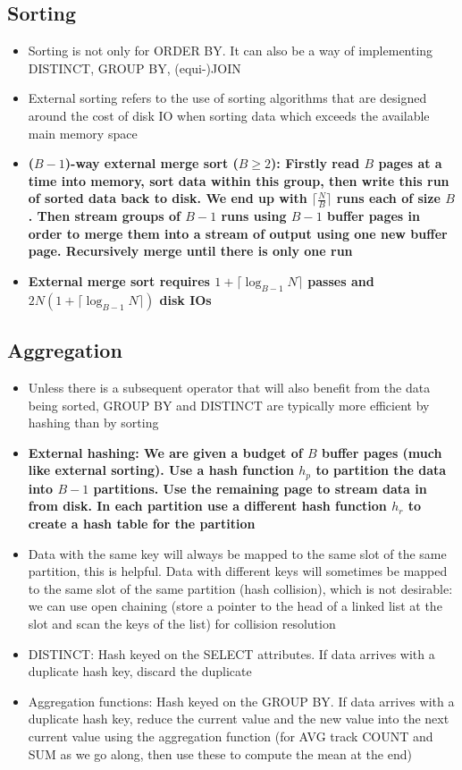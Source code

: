 \documentclass[20pt,a4paper,landscape]{extarticle}
\begin{document}
\begin{flushleft}
\subsection{Sorting}
\begin{itemize}
\item Sorting is not only for ORDER BY. It can also be a way of implementing DISTINCT, GROUP BY, (equi-)JOIN
\item External sorting refers to the use of sorting algorithms that are designed around the cost of disk IO when sorting data which exceeds the available main memory space
\item \textbf{($B-1$)-way external merge sort ($B \geq 2$): Firstly read $B$ pages at a time into memory, sort data within this group, then write this run of sorted data back to disk. We end up with $\lceil \frac{N}{B}\rceil$ runs each of size $B$. Then stream groups of $B-1$ runs using $B - 1$ buffer pages in order to merge them into a stream of output using one new buffer page. Recursively merge until there is only one run}
\item \textbf{External merge sort requires \boldmath$1 + \lceil\log_{B - 1} N\rceil$ passes and $2N(1 + \lceil\log_{B - 1} N\rceil)$ disk IOs}
\end{itemize}
\subsection{Aggregation}
\begin{itemize}
\item Unless there is a subsequent operator that will also benefit from the data being sorted, GROUP BY and DISTINCT are typically more efficient by hashing than by sorting
\item \textbf{External hashing: We are given a budget of $B$ buffer pages (much like external sorting). Use a hash function $h_p$ to partition the data into $B-1$ partitions. Use the remaining page to stream data in from disk. In each partition use a different hash function $h_r$ to create a hash table for the partition}
\item Data with the same key will always be mapped to the same slot of the same partition, this is helpful. Data with different keys will sometimes be mapped to the same slot of the same partition (hash collision), which is not desirable: we can use open chaining (store a pointer to the head of a linked list at the slot and scan the keys of the list) for collision resolution
\item DISTINCT: Hash keyed on the SELECT attributes. If data arrives with a duplicate hash key, discard the duplicate
\item Aggregation functions: Hash keyed on the GROUP BY. If data arrives with a duplicate hash key, reduce the current value and the new value into the next current value using the aggregation function (for AVG track COUNT and SUM as we go along, then use these to compute the mean at the end)
\end{itemize}

\end{flushleft}
\end{document}
